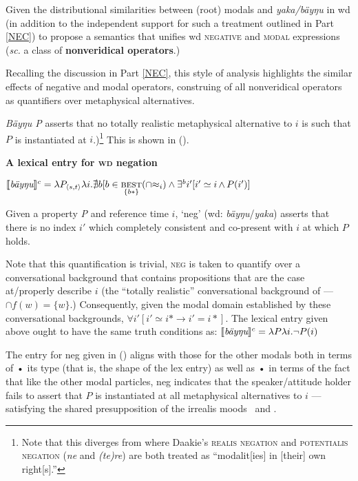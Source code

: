 Given the distributional similarities between (root) modals and \textit{yaka/bäyŋu} in \gls{wd} (in addition to the independent support for such a treatment outlined in Part \ref{NEC}) to propose a semantics that unifies \gls{wd} \textsc{negative} and \textsc{modal} expressions (\textit{sc.} a class of \textbf{nonveridical operators}.)


Recalling the discussion in Part \ref{NEC}, this style of analysis highlights the similar effects of negative and modal operators, construing of all nonveridical operators as quantifiers over metaphysical alternatives. 

\textit{Bäyŋu P} asserts that no totally realistic metaphysical alternative to $ i $ is such that $ P$ is instantiated at $ i $.)\footnote{Note that this diverges from \citet{Krifka2015,Krifka2016} where Daakie's \textsc{realis negation} and \textsc{potentialis negation} (\textit{ne} and \textit{\textit{(te)re}}) are both treated as ``modalit[ies] in [their] own right[s].''} This is shown in (\nextx).

\pex \textbf{A lexical entry for \textsc{wd} negation}

$ \denote[c]{\textit{bäyŋu}} = \lambda P_{\langle s,t\rangle}\lambda i. \nexists b[b\in\underset{\{b*\}}{\textsc{best}}(\cap{\approx_i})\wedge\exists^b i'[i'\simeq i\mathop\wedge P(i')] $

Given a property \textit{P} and reference time $ i $, `\gls{neg}' (\gls{wd}: \textit{bäyŋu}/\textit{yaka}) asserts that there is no index $ i' $ which completely consistent and co-present with $ i $ at which $ P $ holds.

Note that this quantification is trivial, \textsc{neg} is taken to quantify over a conversational background that contains propositions that are the case at/properly describe $ i $ (the ``totally realistic'' conversational background of \citet[295]{Kratzer1981} --- $ \cap f(w)=\{w\} $.) Consequently, given the modal domain established by these conversational backgrounds, $ \forall i'[i'\simeq i*\to i'=i*] $.  The lexical entry given above ought to have the same truth conditions as: $ {\denote[c]{\textit{bäyŋu}}=\lambda P\lambda i.\neg P(i)} $

\xe

The entry for \gls{neg} given in (\lastx) aligns with those for the other modals both in terms of • its type (that is, the shape of the lex entry) as well as • in terms of the fact that like the other modal particles, \gls{neg} indicates that the speaker/attitude holder fails to assert that $ P $ is instantiated at all metaphysical alternatives to $ i $ --- satisfying the shared presupposition of the irrealis moods \II~and \IV. 


